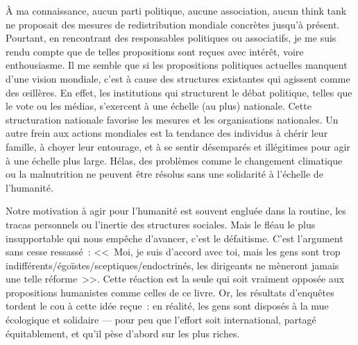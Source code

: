 \documentclass[a5paper,french,openany]{memoir}
\begin{document}
À ma connaissance, aucun parti politique, aucune association, aucun think tank ne proposait des mesures de redistribution mondiale concrètes jusqu'à présent. Pourtant, en rencontrant des responsables politiques ou associatifs, je me suis rendu compte que de telles propositions sont reçues avec intérêt, voire enthousiasme. Il me semble que si les propositions politiques actuelles manquent d'une vision mondiale, c'est à cause des structures existantes qui agissent comme des œillères. En effet, les institutions qui structurent le débat politique, telles que le vote ou les médias, s'exercent à une échelle (au plus) nationale. Cette structuration nationale favorise les mesures et les organisations nationales. Un autre frein aux actions mondiales est la tendance des individus à chérir leur famille, à choyer leur entourage, et à se sentir désemparés et illégitimes pour agir à une échelle plus large. %
Hélas, des problèmes comme le changement climatique ou la malnutrition ne peuvent être résolus sans une solidarité à l'échelle de l'humanité. 

Notre motivation à agir pour l'humanité est souvent engluée dans la routine, les tracas personnels ou l'inertie des structures sociales. %
Mais le fléau le plus insupportable qui nous empêche d'avancer, c'est le défaitisme. C'est l'argument sans cesse ressassé~: <<~Moi, je suis d'accord avec toi, mais les gens sont trop indifférents/égoïstes/sceptiques/endoctrinés, les dirigeants ne mèneront jamais une telle réforme~>>. Cette réaction est la seule qui soit vraiment opposée aux propositions humanistes comme celles de ce livre. %
Or, les résultats d'enquêtes tordent le cou à cette idée reçue~: en réalité, les gens sont disposés à la mue écologique et solidaire --- pour peu que l'effort soit international, partagé équitablement, et qu'il pèse d'abord sur les plus riches. %
\end{document}
